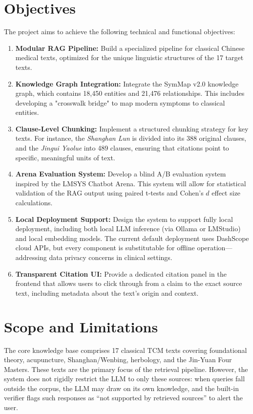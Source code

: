\documentclass[11pt,a4paper]{report}
\begin{document}
\section{Objectives}
The project aims to achieve the following technical and functional objectives:
\begin{enumerate}
    \item \textbf{Modular RAG Pipeline:} Build a specialized pipeline for classical Chinese medical texts, optimized for the unique linguistic structures of the 17 target texts.
    \item \textbf{Knowledge Graph Integration:} Integrate the SymMap v2.0 knowledge graph, which contains 18,450 entities and 21,476 relationships. This includes developing a "crosswalk bridge" to map modern symptoms to classical entities.
    \item \textbf{Clause-Level Chunking:} Implement a structured chunking strategy for key texts. For instance, the \textit{Shanghan Lun} is divided into its 388 original clauses, and the \textit{Jingui Yaolue} into 489 clauses, ensuring that citations point to specific, meaningful units of text.
    \item \textbf{Arena Evaluation System:} Develop a blind A/B evaluation system inspired by the LMSYS Chatbot Arena. This system will allow for statistical validation of the RAG output using paired t-tests and Cohen's $d$ effect size calculations.
    \item \textbf{Local Deployment Support:} Design the system to support fully local deployment, including both local LLM inference (via Ollama or LMStudio) and local embedding models. The current default deployment uses DashScope cloud APIs, but every component is substitutable for offline operation---addressing data privacy concerns in clinical settings.
    \item \textbf{Transparent Citation UI:} Provide a dedicated citation panel in the frontend that allows users to click through from a claim to the exact source text, including metadata about the text's origin and context.
\end{enumerate}

\section{Scope and Limitations}
The core knowledge base comprises 17 classical TCM texts covering foundational theory, acupuncture, Shanghan/Wenbing, herbology, and the Jin-Yuan Four Masters. These texts are the primary focus of the retrieval pipeline. However, the system does not rigidly restrict the LLM to only these sources: when queries fall outside the corpus, the LLM may draw on its own knowledge, and the built-in verifier flags such responses as ``not supported by retrieved sources'' to alert the user.
\end{document}
